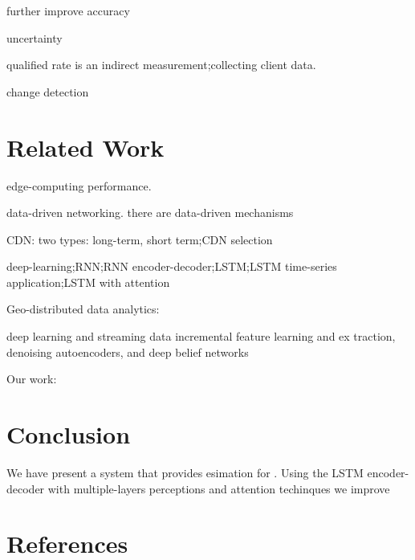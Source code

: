 \documentclass[review]{elsarticle}
\begin{document}
further improve accuracy

uncertainty

qualified rate is an indirect measurement;collecting client data.

change detection
\section{Related Work}
edge-computing performance.\cite{SatyanarayananTheComputing}

data-driven networking. there are data-driven mechanisms

CDN: two types: long-term, short term;CDN selection \cite{Jiang2017Pytheas:Exploration-Exploitation}

deep-learning;RNN;RNN encoder-decoder;LSTM;LSTM time-series application;LSTM with attention

Geo-distributed data analytics:

deep learning and streaming data \cite{Najafabadi2015DeepAnalytics} incremental feature learning and ex traction, denoising autoencoders, and deep belief networks


Our work:
    \cite{Wang2017}

\section{Conclusion}
We have present a system that provides esimation for . Using the LSTM encoder-decoder with multiple-layers perceptions and attention techinques we improve 
\section*{References}



\end{document}
